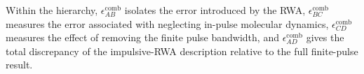 Within the hierarchy,
$\epsilon_{AB}^{\mathrm{comb}}$ isolates the error introduced by the
RWA,
$\epsilon_{BC}^{\mathrm{comb}}$ measures the error associated with
neglecting in-pulse molecular dynamics,
$\epsilon_{CD}^{\mathrm{comb}}$ measures the effect of removing the
finite pulse bandwidth, and
$\epsilon_{AD}^{\mathrm{comb}}$ gives the total discrepancy of the
impulsive-RWA description relative to the full finite-pulse result.